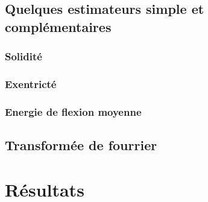 \documentclass{article}
\begin{document}
    \subsection{Quelques estimateurs simple et complémentaires}

      \subsubsection{Solidité}
      
      \subsubsection{Exentricté}
      
      \subsubsection{Energie de flexion moyenne}
    
    \subsection{Transformée de fourrier}
    
    \subsection{}
  
  \section{Résultats}
  
\end{document}

